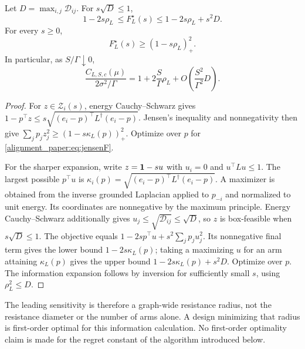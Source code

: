 \begin{theorem}
Let $D=\max_{i,j}\mathcal D_{ij}$. For $s\sqrt D\le1$,
\begin{equation}
 1-2s\rho_L\ \le F_L^\star(s)
 \le 1-2s\rho_L+s^2D.
 \label{alignment_paper:eq:firstorderF}
\end{equation}
For every $s\ge0$,
\begin{equation}
 F_L^\star(s)\ge(1-s\rho_L)_+^2.
 \label{alignment_paper:eq:jensenF}
\end{equation}
In particular, as $S/\Gamma\downarrow0$,
\begin{equation}
 \frac{C_{L,S,c}(\mu)}{2\sigma^2/\Gamma}
 =1+2\frac S\Gamma\rho_L
   +O\!\left(\frac{S^2}{\Gamma^2}D\right).
 \label{alignment_paper:eq:sensitivity}
\end{equation}
\label{alignment_paper:thm:sensitivity}
\end{theorem}
\begin{proof}
For $z\in\mathcal Z_i(s)$, energy Cauchy--Schwarz gives
$1-p^\top z\le s\sqrt{(e_i-p)^\top L^\dagger(e_i-p)}$.
Jensen's inequality and nonnegativity then give
$\sum_jp_jz_j^2\ge(1-s\kappa_L(p))_+^2$. Optimize over $p$ for \eqref{alignment_paper:eq:jensenF}.

For the sharper expansion, write $z=\mathbf1-su$ with $u_i=0$ and $u^\top Lu\le1$. The largest possible $p^\top u$ is $\kappa_i(p)=\sqrt{(e_i-p)^\top L^\dagger(e_i-p)}$. A maximizer is obtained from the inverse grounded Laplacian applied to $p_{-i}$ and normalized to unit energy. Its coordinates are nonnegative by the maximum principle. Energy Cauchy--Schwarz additionally gives $u_j\le\sqrt{\mathcal D_{ij}}\le\sqrt D$, so $z$ is box-feasible when $s\sqrt D\le1$. The objective equals $1-2sp^\top u+s^2\sum_jp_ju_j^2$. Its nonnegative final term gives the lower bound $1-2s\kappa_L(p)$; taking a maximizing $u$ for an arm attaining $\kappa_L(p)$ gives the upper bound $1-2s\kappa_L(p)+s^2D$. Optimize over $p$. The information expansion follows by inversion for sufficiently small $s$, using $\rho_L^2\le D$.
\end{proof}
The leading sensitivity is therefore a graph-wide resistance radius, not the resistance diameter or the number of arms alone. A design minimizing that radius is first-order optimal for this information calculation. No first-order optimality claim is made for the regret constant of the algorithm introduced below.

